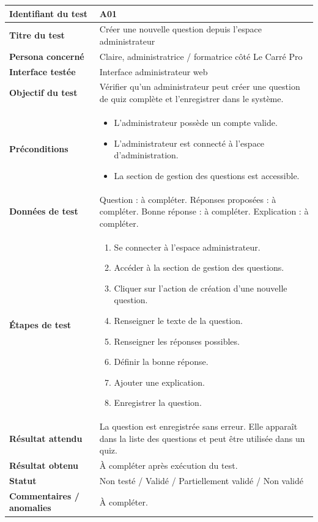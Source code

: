 \begin{longtable}{|p{4cm}|p{10cm}|}
\textbf{Identifiant du test} & A01 \\ \hline
\textbf{Titre du test} & Créer une nouvelle question depuis l'espace administrateur \\ \hline
\textbf{Persona concerné} & Claire, administratrice / formatrice côté Le Carré Pro \\ \hline
\textbf{Interface testée} & Interface administrateur web \\ \hline
\textbf{Objectif du test} & Vérifier qu'un administrateur peut créer une question de quiz complète et l'enregistrer dans le système. \\ \hline
\textbf{Préconditions} &
\begin{itemize}
    \item L'administrateur possède un compte valide.
    \item L'administrateur est connecté à l'espace d'administration.
    \item La section de gestion des questions est accessible.
\end{itemize}
\\ \hline
\textbf{Données de test} & 
Question : à compléter. \newline
Réponses proposées : à compléter. \newline
Bonne réponse : à compléter. \newline
Explication : à compléter. \\ \hline
\textbf{Étapes de test} &
\begin{enumerate}
    \item Se connecter à l'espace administrateur.
    \item Accéder à la section de gestion des questions.
    \item Cliquer sur l'action de création d'une nouvelle question.
    \item Renseigner le texte de la question.
    \item Renseigner les réponses possibles.
    \item Définir la bonne réponse.
    \item Ajouter une explication.
    \item Enregistrer la question.
\end{enumerate}
\\ \hline
\textbf{Résultat attendu} & 
La question est enregistrée sans erreur. Elle apparaît dans la liste des questions et peut être utilisée dans un quiz. \\ \hline
\textbf{Résultat obtenu} & À compléter après exécution du test. \\ \hline
\textbf{Statut} & Non testé / Validé / Partiellement validé / Non validé \\ \hline
\textbf{Commentaires / anomalies} & À compléter. \\
\end{longtable}
\endgroup


